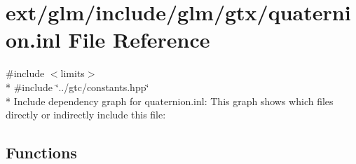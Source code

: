 \hypertarget{glm_2include_2glm_2gtx_2quaternion_8inl}{\section{ext/glm/include/glm/gtx/quaternion.inl File Reference}
\label{glm_2include_2glm_2gtx_2quaternion_8inl}
}
{\ttfamily \#include $<$limits$>$}\\*
{\ttfamily \#include \char`\"{}../gtc/constants.\-hpp\char`\"{}}\\*
Include dependency graph for quaternion.\-inl\-:
This graph shows which files directly or indirectly include this file\-:
\subsection*{Functions}
